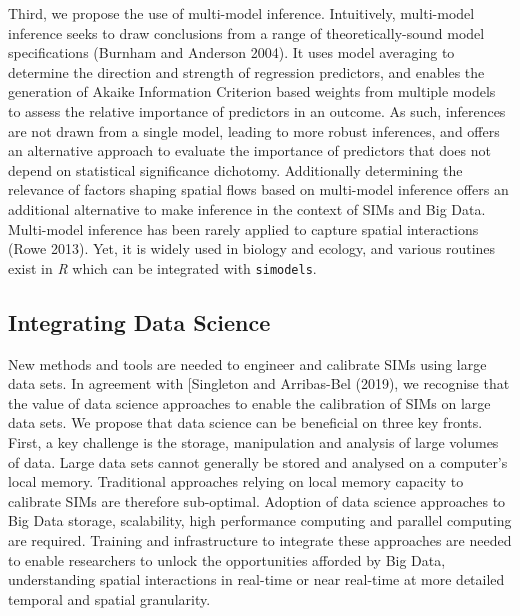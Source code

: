 \documentclass[11pt,letterpaper]{article}
\begin{document}
Third, we propose the use of multi-model inference.
Intuitively, multi-model inference seeks to draw conclusions from a range of theoretically-sound model specifications (Burnham and Anderson 2004).
It uses model averaging to determine the direction and strength of regression predictors, and enables the generation of Akaike Information Criterion based weights from multiple models to assess the relative importance of predictors in an outcome.
As such, inferences are not drawn from a single model, leading to more robust inferences, and offers an alternative approach to evaluate the importance of predictors that does not depend on statistical significance dichotomy.
Additionally determining the relevance of factors shaping spatial flows based on multi-model inference offers an additional alternative to make inference in the context of SIMs and Big Data.
Multi-model inference has been rarely applied to capture spatial interactions (Rowe 2013).
Yet, it is widely used in biology and ecology, and various routines exist in \emph{R} which can be integrated with \texttt{simodels}.

\hypertarget{integrating-data-science}{%
\subsection{Integrating Data Science}\label{integrating-data-science}}

New methods and tools are needed to engineer and calibrate SIMs using large data sets.
In agreement with {[}Singleton and Arribas-Bel (2019), we recognise that the value of data science approaches to enable the calibration of SIMs on large data sets.
We propose that data science can be beneficial on three key fronts.
First, a key challenge is the storage, manipulation and analysis of large volumes of data.
Large data sets cannot generally be stored and analysed on a computer's local memory.
Traditional approaches relying on local memory capacity to calibrate SIMs are therefore sub-optimal.
Adoption of data science approaches to Big Data storage, scalability, high performance computing and parallel computing are required.
Training and infrastructure to integrate these approaches are needed to enable researchers to unlock the opportunities afforded by Big Data, understanding spatial interactions in real-time or near real-time at more detailed temporal and spatial granularity.
\end{document}
